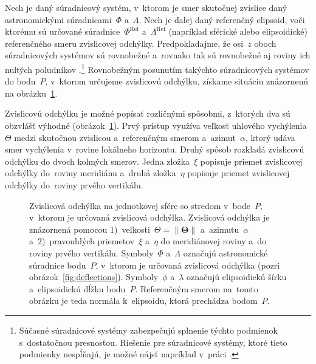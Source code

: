 \documentclass[a4paper, 12pt]{book}
\begin{document}
Nech je daný súradnicový systém, v~ktorom je smer skutočnej zvislice daný 
astronomickými súradnicami~$\Phi$ a~$\Lambda$.  Nech je ďalej daný referenčný 
elipsoid, voči ktorému sú určované súradnice~$\Phi^{\mathrm{Ref}}$ 
a~$\Lambda^{\mathrm{Ref}}$ (napríklad sférické alebo elipsoidické) referenčného 
smeru zvislicovej odchýlky.  Predpokladajme, že osi~$z$ oboch súradnicových 
systémov sú rovnobežné a~rovnako tak sú rovnobežné aj roviny ich nultých 
poludníkov \parencite{TorgeGeodesy}.\footnote{Súčasné súradnicové systémy 
zabezpečujú splnenie týchto podmienok s~dostatočnou presnosťou.  Riešenie pre 
súradnicové systémy, ktoré tieto podmienky nespĺňajú, je možné nájsť napríklad 
v~práci \textcite{Pick2000}.}  Rovnobežným posunutím takýchto súradnicových 
systémov do bodu~$P$, v~ktorom určujeme zvislicovú odchýlku, získame situáciu 
znázornenú na obrázku~\ref{fig:deflections_unit_sphere}.

Zvislicovú odchýlku je možné popísať rozličnými spôsobmi, z~ktorých dva sú 
obzvlášť výhodné (obrázok~\ref{fig:deflections_unit_sphere}).  Prvý prístup 
využíva veľkosť uhlového vychýlenia~$\Theta$ medzi skutočnou zvislicou 
a~referenčným smerom a~azimut~$\alpha$, ktorý udáva smer vychýlenia v~rovine 
lokálneho horizontu.  Druhý spôsob rozkladá zvislicovú odchýlku do dvoch 
kolmých smerov.  Jedna zložka~$\xi$ popisuje priemet zvislicovej odchýlky 
do~roviny meridiánu a~druhá zložka~$\eta$ popisuje priemet zvislicovej odchýlky 
do~roviny prvého vertikálu.

\begin{figure}[bt]
\centering

\caption{Zvislicová odchýlka na jednotkovej sfére so stredom v~bode~$P$, 
v~ktorom je určovaná zvislicová odchýlka.  Zvislicová odchýlka je znázornená 
pomocou 1)~veľkosti~$\Theta = \| \boldsymbol\Theta \|$ a~azimutu~$\alpha$ 
a~2)~pravouhlých priemetov~$\xi$ a~$\eta$ do meridiánovej roviny a~do roviny 
prvého vertikálu.  Symboly~$\Phi$ a~$\Lambda$ označujú astronomické súradnice 
bodu~$P$, v~ktorom je určovaná zvislicová odchýlka (pozri 
obrázok~\ref{fig:deflections}).  Symboly~$\phi$ a~$\lambda$ označujú 
elipsoidickú šírku a~elipsoidickú dĺžku bodu~$P$.  Referenčným smerom na~tomto 
obrázku je teda normála k~elipsoidu, ktorá prechádza bodom~$P$.}
\label{fig:deflections_unit_sphere}
\end{figure}
\end{document}
